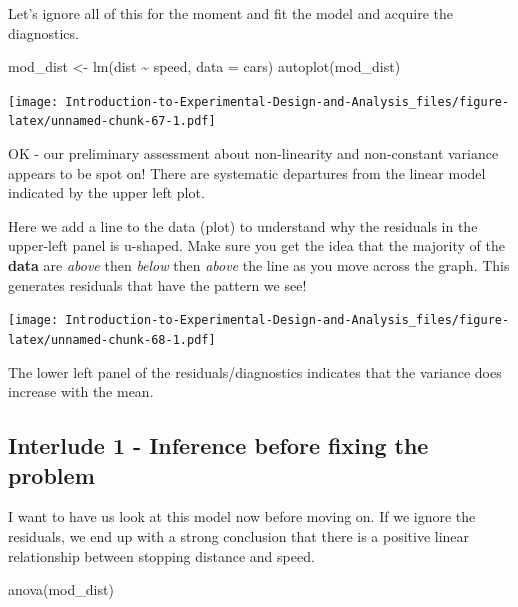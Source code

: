 \documentclass[
]{book}
\newenvironment{Shaded}{\begin{snugshade}}{\end{snugshade}}
\newcommand{\AttributeTok}[1]{\textcolor[rgb]{0.77,0.63,0.00}{#1}}
\newcommand{\FunctionTok}[1]{\textcolor[rgb]{0.00,0.00,0.00}{#1}}
\newcommand{\NormalTok}[1]{#1}
\newcommand{\OtherTok}[1]{\textcolor[rgb]{0.56,0.35,0.01}{#1}}
\newcommand{\SpecialCharTok}[1]{\textcolor[rgb]{0.00,0.00,0.00}{#1}}
\begin{document}
Let's ignore all of this for the moment and fit the model and acquire the diagnostics.

\begin{Shaded}
\begin{Highlighting}[]
\NormalTok{mod\_dist }\OtherTok{\textless{}{-}} \FunctionTok{lm}\NormalTok{(dist }\SpecialCharTok{\textasciitilde{}}\NormalTok{ speed, }\AttributeTok{data =}\NormalTok{ cars)}
\FunctionTok{autoplot}\NormalTok{(mod\_dist)}
\end{Highlighting}
\end{Shaded}

\texttt{[image: Introduction-to-Experimental-Design-and-Analysis\_files/figure-latex/unnamed-chunk-67-1.pdf]}

OK - our preliminary assessment about non-linearity and non-constant variance appears to be spot on! There are systematic departures from the linear model indicated by the upper left plot.

Here we add a line to the data (plot) to understand why the residuals in the upper-left panel is u-shaped. Make sure you get the idea that the majority of the \textbf{data} are \emph{above} then \emph{below} then \emph{above} the line as you move across the graph. This generates residuals that have the pattern we see!

\texttt{[image: Introduction-to-Experimental-Design-and-Analysis\_files/figure-latex/unnamed-chunk-68-1.pdf]}

The lower left panel of the residuals/diagnostics indicates that the variance does increase with the mean.

\hypertarget{interlude-1---inference-before-fixing-the-problem}{%
\subsection{Interlude 1 - Inference before fixing the problem}\label{interlude-1---inference-before-fixing-the-problem}}

I want to have us look at this model now before moving on. If we ignore the residuals, we end up with a strong conclusion that there is a positive linear relationship between stopping distance and speed.

\begin{Shaded}
\begin{Highlighting}[]
\FunctionTok{anova}\NormalTok{(mod\_dist)}
\end{Highlighting}
\end{Shaded}
\end{document}
